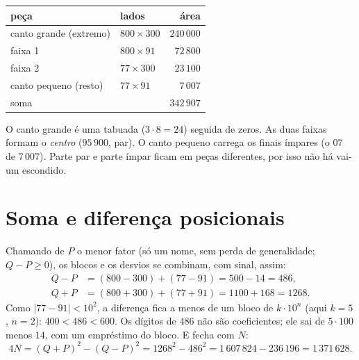 \documentclass[11pt,a4paper]{article}
\newcommand{\N}{342\,907}
\begin{document}
\begin{center}
\end{center}

\begin{center}
\begin{tabular}{llr}
\toprule
peça & lados & área \\
\midrule
canto grande (extremo) & $800\times 300$ & $240\,000$ \\
faixa 1 & $800\times 91$ & $72\,800$ \\
faixa 2 & $77\times 300$ & $23\,100$ \\
canto pequeno (resto) & $77\times 91$ & $7\,007$ \\
\midrule
soma & & $\N$ \\
\bottomrule
\end{tabular}
\end{center}

O canto grande é uma tabuada ($3\cdot 8=24$) seguida de zeros. As duas faixas formam o \emph{centro} ($95\,900$, par). O canto pequeno carrega os finais ímpares (o $07$ de $7\,007$). Parte par e parte ímpar ficam em peças diferentes, por isso não há vai-um escondido.

\section{Soma e diferença posicionais}

Chamando de $P$ o menor fator (só um nome, sem perda de generalidade; $Q-P\ge 0$), os blocos e os desvios se combinam, com sinal, assim:
\begin{align*}
Q-P &= (800-300) + (77-91) = 500 - 14 = 486,\\
Q+P &= (800+300) + (77+91) = 1100 + 168 = 1268 .
\end{align*}
Como $|77-91|<10^2$, a diferença fica a menos de um bloco de $k\cdot 10^n$ (aqui $k=5$, $n=2$): $400<486<600$. Os dígitos de $486$ não são coeficientes; ele sai de $5\cdot 100$ menos $14$, com um empréstimo do bloco. E fecha com $N$:
\[
4N = (Q+P)^2-(Q-P)^2 = 1268^2-486^2 = 1\,607\,824-236\,196 = 1\,371\,628 .
\]
\end{document}
